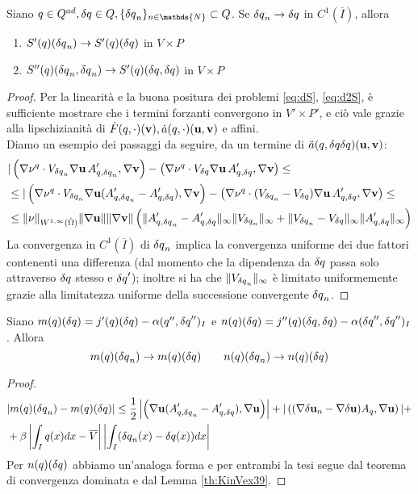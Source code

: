 %
\begin{lemma}
	Siano $q\in\Q,\dq\in Q,\{\dq_n\}_{n\in\mathds{N}}\subset Q$. Se ${\delta q}_n\to{\delta q}$ in $C^1(\overline{I})$, allora
	\begin{enumerate}
	\item $S'(q)({\delta q}_n)\to S'(q)({\delta q})$ in $V\times P$
	\item $S''(q)({\delta q}_n,{\delta q}_n)\to S'(q)({\delta q},{\delta q})$ in $V\times P$
	\end{enumerate}
\label{th:KinVex39}
\end{lemma}
\begin{proof}
	Per la linearità e la buona positura dei problemi \eqref{eq:dS}, \eqref{eq:d2S}, è sufficiente mostrare che i termini forzanti convergono in $V'\times P'$, e ciò vale grazie alla lipschizianità di $\dot{F}(q,\cdot)(\mathbf{v}),\dot{a}(q,\cdot)(\mathbf{u},\mathbf{v})$ e affini.\\
	Diamo un esempio dei passaggi da seguire, da un termine di $\ddot{a}(q,{\delta q}{\delta q})(\mathbf{u},\mathbf{v})$:
	\begin{equation*}\begin{split}
	&|\left(\nabla\nu^q\cdot V_{{\delta q}_n}\nabla\mathbf{u}\,A'_{q,{\delta q}_n},\nabla\mathbf{v}\right)-\left(\nabla\nu^q\cdot V_{\delta q}\nabla\mathbf{u}\,A'_{q,{\delta q}},\nabla\mathbf{v}\right)\leq\\
	&\leq|\left(\nabla\nu^q\cdot V_{{\delta q}_n}\nabla\mathbf{u}(A'_{q,{\delta q}_n}-A'_{q,{\delta q}}),\nabla\mathbf{v}\right)-\left(\nabla\nu^q\cdot (V_{{\delta q}_n}-V_{\delta q})\nabla\mathbf{u}\,A'_{q,{\delta q}},\nabla\mathbf{v}\right)\leq\\
	&\leq\|\nu\|_{W^{1,\infty}(\hat{\Omega})}\|\nabla\mathbf{u}\|\|\nabla\mathbf{v}\|\left(\|A'_{q,{\delta q}_n}-A'_{q,{\delta q}}\|_\infty\|V_{{\delta q}_n}\|_\infty+\|V_{{\delta q}_n}-V_{\delta q}\|_\infty\|A'_{q,{\delta q}}\|_\infty\right)
	\end{split}\end{equation*}
	La convergenza in $C^1(\overline{I})$ di ${\delta q}_n$ implica la convergenza uniforme dei due fattori contenenti una differenza (dal momento che la dipendenza da ${\delta q}$ passa solo attraverso ${\delta q}$ stesso e ${\delta q}'$); inoltre si ha che $\|V_{{\delta q}_n}\|_\infty$ è limitato uniformemente grazie alla limitatezza uniforme della successione convergente ${\delta q}_n$.
\end{proof}
%
\begin{cor}
	Siano $m(q)({\delta q})=j'(q)({\delta q})-\alpha(q'',{\delta q}'')_I$ e $n(q)({\delta q})=j''(q)({\delta q},{\delta q})-\alpha({\delta q}'',{\delta q}'')_I$. Allora
	$$ m(q)({\delta q}_n)\to m(q)({\delta q})\qquad n(q)({\delta q}_n)\to n(q)({\delta q})$$
\label{th:KinVex310}
\end{cor}
\begin{proof}
	\begin{equation*}\begin{split}
	&|m(q)({\delta q}_n)-m(q)({\delta q})|\leq\frac{1}{2}\left|\left(\nabla\mathbf{u} (A'_{q,{\delta q}_n}-A'_{q,{\delta q}}),\nabla\mathbf{u}\right)\right|+|\left((\nabla\mathbf{\delta u}_n-\nabla\mathbf{\delta u})A_q,\nabla\mathbf{u}\right)|+\\
	&+\beta\left|\int_Iq(x)dx-\overline{V}\right|\left|\int_I({\delta q}_n(x)-{\delta q}(x))dx\right|
	\end{split}\end{equation*}
	Per $n(q)({\delta q})$ abbiamo un'analoga forma e per entrambi la tesi segue dal teorema di convergenza dominata e dal Lemma \ref{th:KinVex39}.
\end{proof}
